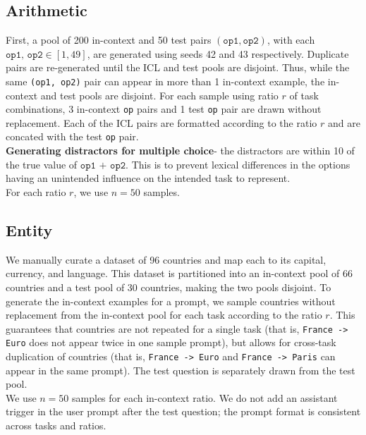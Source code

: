 \documentclass[11pt]{article}
\begin{document}
\subsection*{Arithmetic}
First, a pool of 200 in-context and 50 test pairs \((\texttt{op1}, \texttt{op2})\), with each \(\texttt{op1, op2} \in [1 ,49]\), are generated using seeds 42 and 43 respectively. Duplicate pairs are re-generated until the ICL and test pools are disjoint. Thus, while the same \texttt{(op1, op2)} pair can appear in more than 1 in-context example, the in-context and test pools are disjoint. For each sample using ratio \(r\) of task combinations, 3 in-context \texttt{op} pairs and 1 test \texttt{op} pair are drawn without replacement. Each of the ICL pairs are formatted according to the ratio \(r\) and are concated with the test \texttt{op} pair. \\[1em]
\textbf{Generating distractors for multiple choice}- the distractors are within 10 of the true value of \(\texttt{op1 + op2}\). This is to prevent lexical differences in the options having an unintended influence on the intended task to represent. \\[1em]
For each ratio \(r\), we use \(n = 50\) samples.
\subsection*{Entity}
We manually curate a dataset of 96 countries and map each to its capital, currency, and language. This dataset is partitioned into an in-context pool of 66 countries and a test pool of 30 countries, making the two pools disjoint. 
To generate the in-context examples for a prompt, we sample countries without replacement from the in-context pool for each task according to the ratio \(r\). This guarantees that countries are not repeated for a single task (that is, \texttt{France -> Euro} does not appear twice in one sample prompt), but allows for cross-task duplication of countries (that is, \texttt{France -> Euro} and \texttt{France -> Paris} can appear in the same prompt). The test question is separately drawn from the test pool. \\[1em]
We use \(n = 50\) samples for each in-context ratio. We do not add an assistant trigger in the user prompt after the test question; the prompt format is consistent across tasks and ratios.
\end{document}
